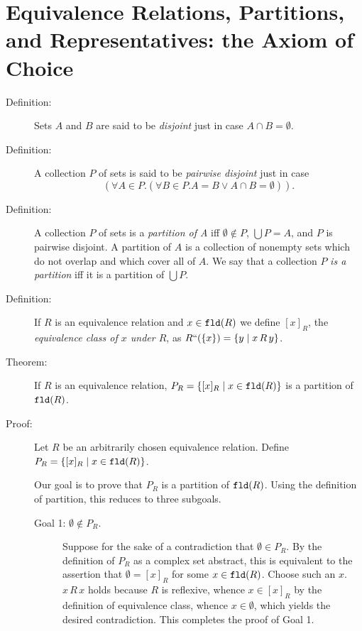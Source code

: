 \documentclass[12pt]{book}
\begin{document}
\newpage

\section{Equivalence Relations, Partitions, and Representatives:  the Axiom of Choice}

\begin{description}

\item[Definition:]  Sets $A$ and $B$ are said to be {\em disjoint\/} just in case $A \cap
B = \emptyset$.

\item[Definition:]A collection $P$ of sets is said to be {\em pairwise disjoint\/} just
in case $$(\forall A \in P.(\forall B \in P.A=B \vee A \cap B = \emptyset)).$$

\item[Definition:]  A collection $P$ of sets is a {\em partition of A\/} iff $\emptyset
\not\in P$, $\bigcup P = A$, and $P$ is pairwise disjoint.  A
partition of $A$ is a collection of nonempty sets which do not overlap
and which cover all of $A$.  We say that a collection $P$ {\em is a
partition\/} iff it is a partition of $\bigcup P$.

\item[Definition:]  If $R$ is an equivalence relation and $x \in {\tt fld}(R)$ we define $[x]_R$,
the {\em equivalence class of $x$ under $R$\/}, as $R``(\{x\}) = \{y \mid x \,R\,y\}$.

\item[Theorem:] If $R$ is an equivalence relation, $P_R= \{[x]_R \mid
x \in {\tt fld}(R)\}$ is a partition of ${\tt fld}(R)$.

\item[Proof:]  Let $R$ be an arbitrarily chosen equivalence relation.
Define $P_R= \{[x]_R \mid x \in {\tt fld}(R)\}$.

Our goal is to prove that $P_R$ is a partition of ${\tt fld}(R)$.
Using the definition of partition, this reduces to three subgoals.

\begin{description}

\item[Goal 1: $\emptyset \not\in P_R$.] Suppose for the sake of a
contradiction that $\emptyset \in P_R$.  By the definition of $P_R$ as
a complex set abstract, this is equivalent to the assertion that
$\emptyset = [x]_R$ for some $x \in {\tt fld}(R)$.  Choose such an
$x$.  $x\,R\,x$ holds because $R$ is reflexive, whence $x \in [x]_R$
by the definition of equivalence class, whence $x \in \emptyset$,
which yields the desired contradiction.  This completes the proof of
Goal 1.


\end{description}
\end{description}
\end{document}
